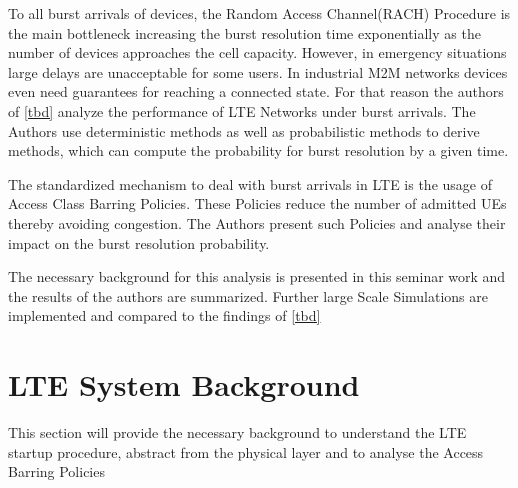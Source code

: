 \documentclass[conference]{IEEEtran}
\begin{document}
To all burst arrivals of devices, the Random Access Channel(RACH) Procedure is the main bottleneck increasing the burst resolution time exponentially as the number of devices approaches the cell capacity.
However, in emergency situations large delays are unacceptable for some users.
In industrial M2M networks devices even need guarantees for reaching a connected state.
For that reason the authors of \ref{tbd} analyze the performance of LTE Networks under burst arrivals.
The Authors use deterministic methods as well as probabilistic methods to derive methods, which can compute the probability for burst resolution by a given time.

The standardized mechanism to deal with burst arrivals in LTE is the usage of Access Class Barring Policies.
These Policies reduce the number of admitted UEs thereby avoiding congestion.
The Authors present such Policies and analyse their impact on the burst resolution probability.

The necessary background for this analysis is presented in this seminar work and the results of the authors are summarized.
Further large Scale Simulations are implemented and compared to the findings of \ref{tbd}

\section{LTE System Background}
This section will provide the necessary background to understand the LTE startup procedure, abstract from the physical layer and to analyse the Access Barring Policies
\end{document}
